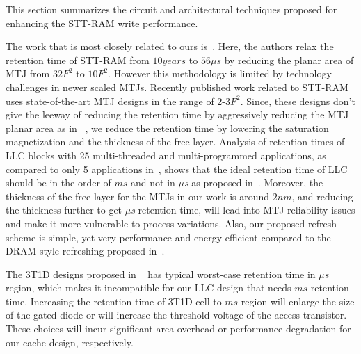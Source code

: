 


This section summarizes the circuit and architectural techniques proposed for enhancing the STT-RAM
write performance.

The work that is most closely related to ours is~\cite{STTRAM:HPCA11}.
Here, the authors relax the retention time of STT-RAM from $10 years$ to $56 \mu s$ by
reducing the planar area of MTJ from $32F^2$ to $10F^2$. However this methodology is limited by 
technology challenges in newer scaled MTJs. Recently published work related to
STT-RAM~\cite{PMTJ:Toshiba08,STTRAM:EDL11,STTRAM:Qualcomm09,STTRAM:Grandis11}
uses state-of-the-art MTJ designs in the range of 2-3$F^2$. Since, these designs don't give the
leeway of reducing the retention time by aggressively reducing the MTJ planar area as in~\cite{STTRAM:HPCA11} , we reduce the retention time by lowering the saturation magnetization and the thickness of the free layer. Analysis of retention times of LLC blocks with 25 multi-threaded and multi-programmed applications,
as compared to only 5 applications in~\cite{STTRAM:HPCA11}, shows that
the ideal retention time of LLC should be in the order of $ms$ and not in {\it $\mu$s} as proposed
in~\cite{STTRAM:HPCA11}. Moreover, the thickness of the free layer for the MTJs in our work is 
around $2nm$, and reducing the thickness further
to get {\it $\mu$s} retention time, will lead into MTJ reliability issues
and make it more vulnerable to process variations. Also, our proposed refresh scheme is simple, yet very performance and energy efficient compared to the DRAM-style refreshing proposed in~\cite{STTRAM:HPCA11}.

The 3T1D designs proposed in ~\cite{3T-brooks} has typical worst-case retention time in {\it $\mu$s} region, which makes it incompatible for our LLC design that needs $ms$ retention time. Increasing the retention time of 3T1D cell to $ms$ region will enlarge the size of the gated-diode or will increase the threshold voltage of the access transistor. These choices will incur significant area overhead or performance degradation for our cache design, respectively. 


